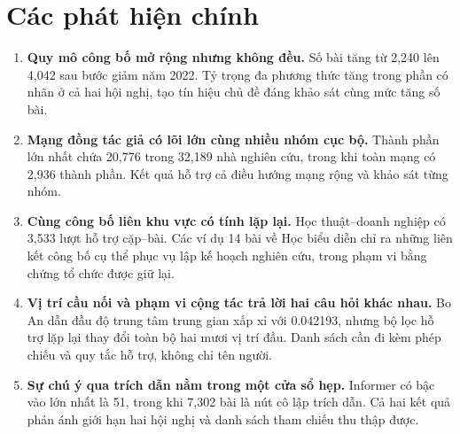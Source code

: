 \section{Các phát hiện chính}
\begin{enumerate}
\item \textbf{Quy mô công bố mở rộng nhưng không đều.} Số bài tăng từ 2,240
lên 4,042 sau bước giảm năm 2022. Tỷ trọng đa phương thức tăng trong phần có
nhãn ở cả hai hội nghị, tạo tín hiệu chủ đề đáng khảo sát cùng mức tăng số bài.
\item \textbf{Mạng đồng tác giả có lõi lớn cùng nhiều nhóm cục bộ.} Thành
phần lớn nhất chứa 20,776 trong 32,189 nhà nghiên cứu, trong khi toàn mạng có
2,936 thành phần. Kết quả hỗ trợ cả điều hướng mạng rộng và khảo sát từng nhóm.
\item \textbf{Cùng công bố liên khu vực có tính lặp lại.} Học thuật--doanh
nghiệp có 3,533 lượt hỗ trợ cặp--bài. Các ví dụ 14 bài về Học biểu diễn chỉ ra
những liên kết công bố cụ thể phục vụ lập kế hoạch nghiên cứu, trong phạm vi
bằng chứng tổ chức được giữ lại.
\item \textbf{Vị trí cầu nối và phạm vi cộng tác trả lời hai câu hỏi khác nhau.}
Bo An dẫn đầu độ trung tâm trung gian xấp xỉ với 0.042193, nhưng bộ lọc hỗ trợ
lặp lại thay đổi toàn bộ hai mươi vị trí đầu. Danh sách cần đi kèm phép chiếu
và quy tắc hỗ trợ, không chỉ tên người.
\item \textbf{Sự chú ý qua trích dẫn nằm trong một cửa sổ hẹp.} Informer có
bậc vào lớn nhất là 51, trong khi 7,302 bài là nút cô lập trích dẫn. Cả hai
kết quả phản ánh giới hạn hai hội nghị và danh sách tham chiếu thu thập được.
\end{enumerate}
